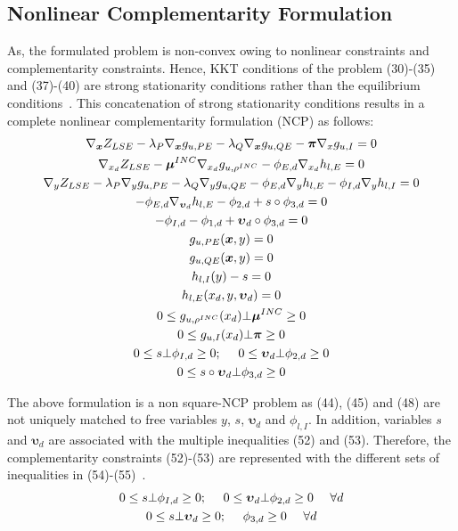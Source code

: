 \documentclass[journal]{IEEEtran}
\begin{document}
\subsection{Nonlinear Complementarity Formulation } 
As, the formulated problem is non-convex owing to nonlinear constraints and complementarity constraints. Hence, KKT conditions of the problem (30)-(35) and (37)-(40) are strong stationarity conditions rather than the equilibrium conditions~\cite{bautista2007formulation}. This concatenation of strong stationarity conditions results in a complete nonlinear complementarity formulation (NCP) as follows:
\begin{gather}
{\nabla_{\boldsymbol{x}}}{Z_{LSE}} - {\lambda _P}{\nabla _{\boldsymbol{x}}}{g_{u,PE}} - {\lambda _Q}{\nabla _{\boldsymbol{x}}}{g_{u,QE}} - \boldsymbol{\pi} {\nabla _x}{g_{u,I}} = 0\\
{\nabla _{{x_d}}}{Z_{LSE}} - {\boldsymbol{\mu} ^{INC}}{\nabla _{{x_d}}}{g_{u,{\rho ^{INC}}}} - {\phi _{E,d}}{\nabla _{{x_d}}}{h_{l,E}} = 0\\
{\nabla _y}{Z_{LSE}} - {\lambda _P}{\nabla _y}{g_{u,PE}} - {\lambda _Q}{\nabla _y}{g_{u,QE}} - {\phi _{E,d}}{\nabla _y}{h_{l,E}} - {\phi _{I,d}}{\nabla _y}{h_{l,I}} = 0\\
- {\phi _{E,d}}{\nabla _{{\boldsymbol{\upsilon} _d}}}{h_{l,E}} - {\phi _{2,d}} + s \circ {\phi _{3,d}} = 0\\
 - {\phi _{I,d}} - {\phi _{1,d}} + {\boldsymbol{\upsilon} _d} \circ {\phi _{3,d}} = 0\\
{g_{u,PE}}(\boldsymbol{x},y) = 0\\
{g_{u,QE}}(\boldsymbol{x},y) = 0\\
{h_{l,I}}(y) - s = 0{\rm{ }}\\
{h_{l,E}}({x_d},y,{\boldsymbol{\upsilon} _d}) = 0\\
0 \le {g_{u,{\rho ^{INC}}}}({x_d}) \bot {\boldsymbol{\mu} ^{INC}} \ge 0\\
0 \le {g_{u,I}}({x_d}) \bot\boldsymbol{ \pi}  \ge 0\\
0 \le s \bot {\phi _{I,d}} \ge 0;~~~~0 \le {\boldsymbol{\upsilon} _d} \bot {\phi _{2,d}} \ge 0\\
0 \le s \circ {\boldsymbol{\upsilon} _d} \bot {\phi _{3,d}} \ge 0
\end{gather}

The above formulation is a non square-NCP problem as (44), (45) and (48) are not uniquely matched to free variables $y$, $s$, ${\boldsymbol{\upsilon} _d}$ and ${\phi _{l,I}}$. In addition, variables $s$ and $\boldsymbol{\upsilon}_d$ are associated with the multiple inequalities (52) and (53). Therefore, the complementarity constraints (52)-(53) are represented with the different sets of inequalities in (54)-(55)~\cite{leyffer2010solving}.
\begin{gather}
0 \le s \bot {\phi _{I,d}} \ge 0;~~~~{\rm{   }}
0 \le {\boldsymbol{\upsilon} _d} \bot {\phi _{2,d}} \ge 0~~~~{\rm{   }}\forall d\\
0 \le s \bot {\boldsymbol{\upsilon} _d} \ge 0;~~~~ {\phi _{3,d}} \ge 0~~~~{\rm{   }}\forall d
\end{gather}
\end{document}
